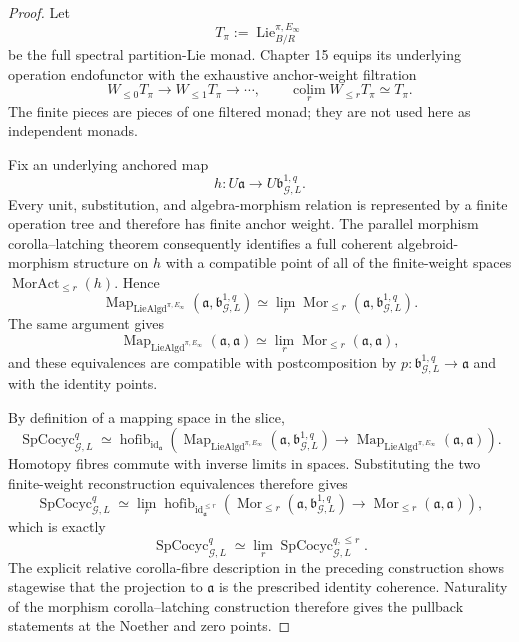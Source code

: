 \begin{proof}
Let
\[
T_{\pi}:=\operatorname{Lie}^{\pi,E_\infty}_{B/R}
\]
be the full spectral partition-Lie monad.  Chapter 15 equips its underlying
operation endofunctor with the exhaustive anchor-weight filtration
\[
W_{\le0}T_{\pi}\longrightarrow
W_{\le1}T_{\pi}\longrightarrow\cdots,
\qquad
\operatorname*{colim}_{r}W_{\le r}T_{\pi}\simeq T_{\pi}.
\]
The finite pieces are pieces of one filtered monad; they are not used here as
independent monads.

Fix an underlying anchored map
\[
h:U\mathfrak a\longrightarrow U\mathfrak b_{\mathcal G,L}^{1,q}.
\]
Every unit, substitution, and algebra-morphism relation is represented by a
finite operation tree and therefore has finite anchor weight.  The parallel
morphism corolla--latching theorem consequently identifies a full coherent
algebroid-morphism structure on $h$ with a compatible point of all of the
finite-weight spaces $\operatorname{MorAct}_{\le r}(h)$.  Hence
\[
\operatorname{Map}_{\operatorname{LieAlgd}^{\pi,E_\infty}}
\left(
\mathfrak a,\mathfrak b_{\mathcal G,L}^{1,q}
\right)
\simeq
\lim_r
\operatorname{Mor}_{\le r}
\left(
\mathfrak a,\mathfrak b_{\mathcal G,L}^{1,q}
\right).
\]
The same argument gives
\[
\operatorname{Map}_{\operatorname{LieAlgd}^{\pi,E_\infty}}
(\mathfrak a,\mathfrak a)
\simeq
\lim_r
\operatorname{Mor}_{\le r}(\mathfrak a,\mathfrak a),
\]
and these equivalences are compatible with postcomposition by
$p:\mathfrak b_{\mathcal G,L}^{1,q}\to\mathfrak a$ and with the identity
points.

By definition of a mapping space in the slice,
\[
\operatorname{SpCocyc}_{\mathcal G,L}^{q}
\simeq
\operatorname{hofib}_{\operatorname{id}_{\mathfrak a}}
\left(
\operatorname{Map}_{\operatorname{LieAlgd}^{\pi,E_\infty}}
(\mathfrak a,\mathfrak b_{\mathcal G,L}^{1,q})
\longrightarrow
\operatorname{Map}_{\operatorname{LieAlgd}^{\pi,E_\infty}}
(\mathfrak a,\mathfrak a)
\right).
\]
Homotopy fibres commute with inverse limits in spaces.  Substituting the two
finite-weight reconstruction equivalences therefore gives
\[
\operatorname{SpCocyc}_{\mathcal G,L}^{q}
\simeq
\lim_r
\operatorname{hofib}_{\operatorname{id}_{\mathfrak a}^{\le r}}
\left(
\operatorname{Mor}_{\le r}
(\mathfrak a,\mathfrak b_{\mathcal G,L}^{1,q})
\longrightarrow
\operatorname{Mor}_{\le r}(\mathfrak a,\mathfrak a)
\right),
\]
which is exactly
\[
\operatorname{SpCocyc}_{\mathcal G,L}^{q}
\simeq
\lim_r\operatorname{SpCocyc}_{\mathcal G,L}^{q,\le r}.
\]
The explicit relative corolla-fibre description in the preceding construction
shows stagewise that the projection to $\mathfrak a$ is the prescribed identity
coherence.  Naturality of the morphism corolla--latching construction therefore
gives the pullback statements at the Noether and zero points.
\end{proof}

